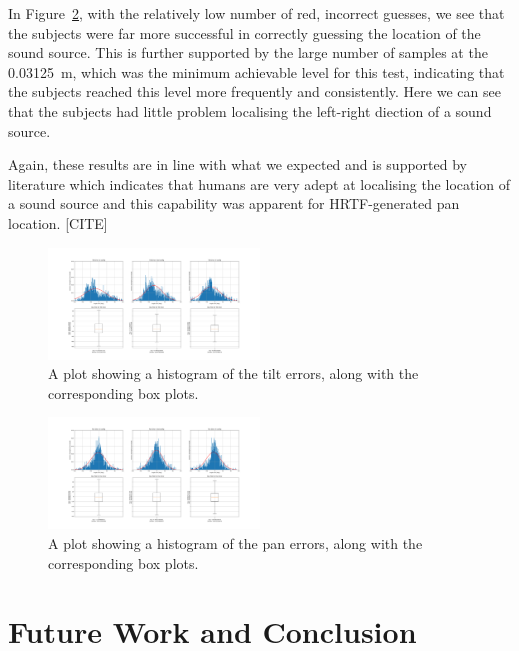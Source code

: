 \documentclass[format=sigconf, review=true, screen=true, anonymous=true]{acmart}
\begin{document}
In Figure~\ref{fig:location-guesses}, with the relatively low number of red, incorrect guesses, we see that the subjects were far more successful in correctly guessing the location of the sound source. This is further supported by the large number of samples at the \SI{0.03125}{\m}, which was the minimum achievable level for this test, indicating that the subjects reached this level more frequently and consistently. Here we can see that the subjects had little problem localising the left-right diection of a sound source. 

Again, these results are in line with what we expected and is supported by literature which indicates that humans are very adept at localising the location of a sound source and this capability was apparent for HRTF-generated pan location. [CITE]

\begin{figure}
  \centering
  \includegraphics[width=0.5\textwidth]{figures/tilt_err_combo.png}
  \caption{A plot showing a histogram of the tilt errors, along with the corresponding box plots. }
  \label{fig:location-guesses}
\end{figure}

\begin{figure}
  \centering
  \includegraphics[width=0.5\textwidth]{figures/pan_err_combo.png}
  \caption{A plot showing a histogram of the pan errors, along with the corresponding box plots. }
  \label{fig:location-guesses}
\end{figure}

\section{Future Work and Conclusion}



\end{document}

